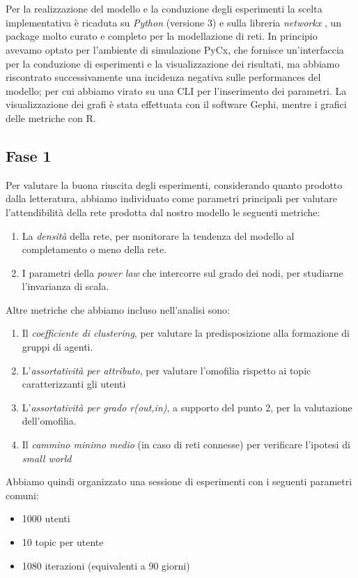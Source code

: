 \documentclass[a4paper,12pt]{article}
\begin{document}
\\
\\
Per la realizzazione del modello e la conduzione degli esperimenti la scelta implementativa è ricaduta su \textit{Python} (versione 3) e sulla libreria \textit{networkx} \cite{nx}, un package molto curato e completo per la modellazione di reti. In principio avevamo optato per l'ambiente di simulazione PyCx, che fornisce un'interfaccia per la conduzione di esperimenti e la visualizzazione dei risultati, ma abbiamo riscontrato successivamente una incidenza negativa sulle performances del modello; per cui abbiamo virato su una CLI per l'inserimento dei parametri. La visualizzazione dei grafi è stata effettuata con il software Gephi, mentre i grafici delle metriche con R.
\subsection{Fase 1}
Per valutare la buona riuscita degli esperimenti, considerando quanto prodotto dalla letteratura, abbiamo individuato come parametri principali per valutare l'attendibilità della rete prodotta dal nostro modello le seguenti metriche:
\begin{enumerate}
    \item La \textit{densità} della rete, per monitorare la tendenza del modello al completamento o meno della rete.
    \item I parametri della \textit{power law} che intercorre sul grado dei nodi, per studiarne l'invarianza di scala.
\end{enumerate}
Altre metriche che abbiamo incluso nell'analisi sono:
\begin{enumerate}
    \item Il \textit{coefficiente di clustering}, per valutare la predisposizione alla formazione di gruppi di agenti.
    \item L'\textit{assortatività per attributo}, per valutare l'omofilia rispetto ai topic caratterizzanti gli utenti
    \item L'\textit{assortatività per grado r(out,in)}, a supporto del punto 2, per la valutazione dell'omofilia.
    \item Il \textit{cammino minimo medio} (in caso di reti connesse) per verificare l'ipotesi di \textit{small world}
\end{enumerate}
Abbiamo quindi organizzato una sessione di esperimenti con i seguenti parametri comuni:
\begin{itemize}
\item 1000 utenti
\item 10 topic per utente
\item 1080 iterazioni (equivalenti a 90 giorni)
\end{itemize}
\end{document}
